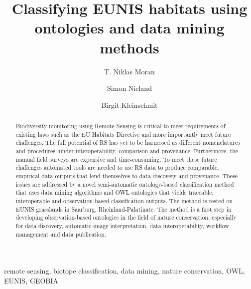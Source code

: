 \documentclass[authoryear,preprint,12pt,number]{elsarticle}
\begin{document}


\tableofcontents
\listoffigures
\listoftables
\printglossary


\begin{frontmatter}
\title{Classifying EUNIS habitats using ontologies and data mining 
methods}

\author[TUB]{T. Niklas Moran}

\author[TUB]{Simon Nieland}
\author[TUB]{Birgit Kleinschmit}

\address[TUB]{Geoinformation in Environmental Planning Lab, Technische
Universit\"at Berlin, Stra\ss e des 17. Juni 145, 10623 Berlin, Germany}


\begin{abstract}
Biodiversity monitoring using Remote Sensing is critical to meet 
requirements of existing laws such as the EU Habitats Directive and more 
importantly meet future challenges. The full potential of RS has yet 
to be harnessed as different nomenclatures and procedures hinder 
interoperability, comparison and provenance. Furthermore, the manual field 
surveys are expensive and time-consuming. To meet 
these future challenges automated tools are needed to use RS data to 
produce comparable, empirical data outputs that lend 
themselves to data discovery and provenance. These issues are addressed by a 
novel semi-automatic ontology-based classification method that uses data mining 
algorithms and OWL ontologies that yields traceable, interoperable and 
observation-based classification outputs. The method is tested on EUNIS 
grasslands in Saarburg, Rheinland-Palatinate. The method is a first 
step in developing observation-based ontologies in the field of nature 
conservation. 
especially for data discovery, automatic image interpretation, data 
interoperability, workflow management and data publication.
\end{abstract}

\begin{keyword}
remote sensing, biotope classification, data mining, nature conservation, OWL, 
EUNIS, GEOBIA 
\end{keyword}
\end{frontmatter}
\end{document}
